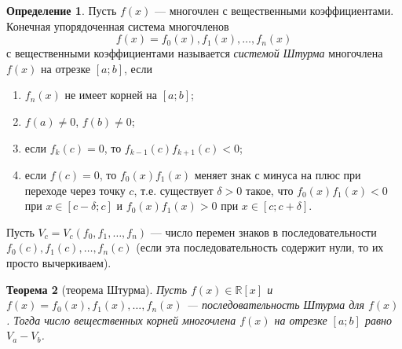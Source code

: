 \documentclass[12pt, titlepage, oneside]{amsbook}
\newcommand{\RR}{\mathbb{R}}
\newtheorem{theorem}{Теорема}[chapter]
\theoremstyle{definition}
\newtheorem{definition}[theorem]{Определение}
\theoremstyle{remark}
\begin{document}
\begin{definition}
	Пусть $f(x)$ --- многочлен с вещественными коэффициентами. Конечная упорядоченная система многочленов $$f(x)=f_0(x),f_1(x),\ldots,f_n(x)$$ с вещественными коэффициентами называется \emph{системой Штурма} многочлена $f(x)$ на отрезке $[a;b]$, если
	\begin{enumerate}
		\item $f_n(x)$ не имеет корней на $[a;b]$;
		\item $f(a)\neq 0$, $f(b)\neq 0$;
		\item если $f_k(c)=0$, то $f_{k-1}(c)f_{k+1}(c)<0$;
		\item если $f(c)=0$, то $f_0(x)f_1(x)$ меняет знак с минуса на плюс при переходе через точку $c$, т.е. существует $\delta>0$ такое, что $f_0(x)f_1(x)<0$ при $x\in[c-\delta;c]$ и $f_0(x)f_1(x)>0$ при $x\in[c;c+\delta]$.
	\end{enumerate}
\end{definition}

Пусть $V_c=V_c(f_0,f_1,\ldots,f_n)$ --- число перемен знаков в последовательности $f_0(c),f_1(c),\ldots,f_n(c)$ (если эта последовательность содержит нули, то их просто вычеркиваем).

\begin{theorem}[теорема Штурма]
	\label{Sht1}
	Пусть $f(x)\in\RR[x]$ и $f(x)=f_0(x),f_1(x),\ldots,f_n(x)$ --- последовательность Штурма для $f(x)$. Тогда число вещественных корней многочлена $f(x)$ на отрезке $[a;b]$ равно $V_a-V_b$.
\end{theorem}
\end{document}
